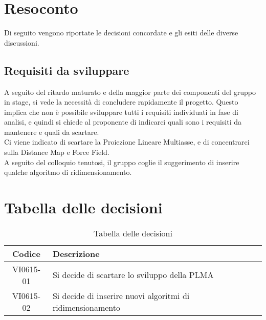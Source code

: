 \documentclass{article}
\begin{document}
\newpage
\section{Resoconto}
\label{sec:resoconto}

Di seguito vengono riportate le decisioni concordate e gli esiti delle diverse discussioni.

\subsection{Requisiti da sviluppare}
\label{itm:1}

A seguito del ritardo maturato e della maggior parte dei componenti del gruppo in stage, si vede la necessità di concludere rapidamente il progetto. Questo implica che non è possibile sviluppare tutti i requisiti 
individuati in fase di analisi, e quindi si chiede al proponente di indicarci quali sono i requisiti da mantenere e quali da scartare. \\
Ci viene indicato di scartare la Proiezione Lineare Multiasse,  e di concentrarci sulla Distance Map e Force Field. \\
A seguito del colloquio tenutosi, il gruppo coglie il suggerimento di inserire qualche algoritmo di ridimensionamento. 

\section{Tabella delle decisioni}%
\label{sub:decisioni}

\begin{table}[!ht]
	\centering
	\begin{tabular}{|c|p{13cm}|}
		\hline
		\rowcolor{lightgray}
		\textbf{Codice} & \textbf{Descrizione} \\
		\hline
			VI0615-01 & Si decide di scartare lo sviluppo della PLMA \\
            VI0615-02 & Si decide di inserire nuovi algoritmi di ridimensionamento \\
		\hline
	\end{tabular}
	\caption{Tabella delle decisioni}
\end{table}
\end{document}

